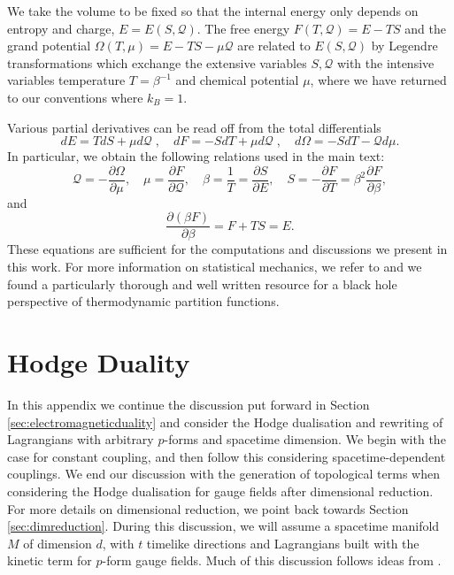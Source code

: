 We take the volume to be fixed so that the internal energy only depends on entropy and charge, $E=E(S,\mathcal{Q})$. The free energy $F(T,\mathcal{Q}) = E-TS$ and the grand potential $\Omega(T,\mu) =E-TS - \mu \mathcal{Q}$ are related to $E(S,\mathcal{Q})$ by Legendre transformations which exchange the extensive variables $S,\mathcal{Q}$ with the intensive variables temperature $T=\beta^{-1}$ and chemical potential $\mu$, where we have returned to our conventions where $k_B = 1$.

Various partial derivatives can be read off from the total differentials
\begin{equation}
dE = TdS + \mu d\mathcal{Q}\;, \quad
dF = - S dT + \mu d \mathcal{Q} \;,\quad
d\Omega = - S dT - \mathcal{Q} d\mu .
\end{equation}
In particular, we obtain the following relations used in the main text:
\begin{equation*}
\mathcal{Q} = - \frac{\partial \Omega}{\partial \mu}, \quad
\mu = \frac{\partial F}{\partial \mathcal{Q}} , \quad
\beta = \frac{1}{T} = \frac{\partial S}{\partial E} , \quad
S = - \frac{\partial F}{\partial T} = \beta^2 \frac{\partial F}{\partial \beta},
\end{equation*}
and
\[
\frac{\partial (\beta F)}{\partial \beta} = F + TS = E.
\]
These equations are sufficient for the computations and discussions we present in this work. For more information on statistical mechanics, we refer to \cite{Sethna:2006} and we found \cite{Hawking:1995ap} a particularly thorough and well written resource for a black hole perspective of thermodynamic partition functions. 

\chapter{Hodge Duality}
\label{app:Hodgeduality}

In this appendix we continue the discussion put forward in Section \ref{sec:electromagneticduality} and consider the Hodge dualisation and rewriting of Lagrangians with arbitrary $p$-forms and spacetime dimension. We begin with the case for constant coupling, and then follow this considering spacetime-dependent couplings. We end our discussion with the generation of topological terms when considering the Hodge dualisation for gauge fields after dimensional reduction. For more details on dimensional reduction, we point back towards Section \ref{sec:dimreduction}. During this discussion, we will assume a spacetime manifold $M$ of dimension $d$, with $t$ timelike directions and Lagrangians built with the kinetic term for $p$-form gauge fields. Much of this discussion follows ideas from \cite{Atiyah:lecturenotes, Gibbons:lecturenotes}. 
 
